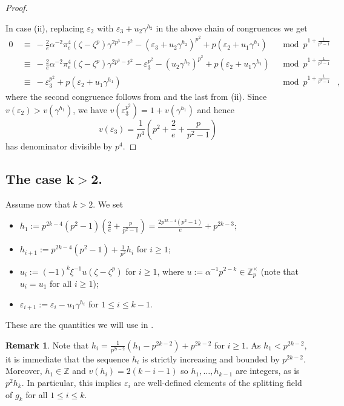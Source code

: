 \documentclass{amsart}
\theoremstyle{definition}
\newtheorem{remark}[theorem]{Remark}
\newcommand{\Z}{\mathbb{Z}}
\numberwithin{theorem}{section}
\numberwithin{equation}{section}
\begin{document}
\begin{proof}
\begin{enumerate}
    \end{enumerate}
    In case (ii), replacing $\varepsilon_2$ with $\varepsilon_3 + u_2\gamma^{h_2}$ in the above chain of congruences we get
    \begin{align*}
        0 \ 
        &\equiv \ -\tfrac{2}{e}\alpha^{-2}\pi_e^4(\zeta-\zeta^p)\gamma^{2p^3-p^2} - (\varepsilon_3+u_2\gamma^{h_2})^{p^2} +p(\varepsilon_2 +u_1\gamma^{h_1}) & \mod p^{1+\frac{1}{p^2-1}} \\
        &\equiv \ -\tfrac{2}{e}\alpha^{-2}\pi_e^4(\zeta-\zeta^p)\gamma^{2p^3-p^2} - \varepsilon_3^{p^2} -(u_2\gamma^{h_2})^{p^2} +p(\varepsilon_2 +u_1\gamma^{h_1}) & \mod p^{1+\frac{1}{p^2-1}} \\
        &\equiv \ -\varepsilon_3^{p^2} +p(\varepsilon_2 +u_1\gamma^{h_1}) & \mod p^{1+\frac{1}{p^2-1}}&,
    \end{align*}
    where the second congruence follows from  and the last from (ii).
    Since $v(\varepsilon_2)>v(\gamma^{h_1})$, we have $v(\varepsilon_3^{p^2})=1+v(\gamma^{h_1})$ and hence
    \[
    v(\varepsilon_3)=\frac{1}{p^4} \left(p^2+\frac{2}{e}+\frac{p}{p^2-1} \right)
    \]
    has denominator divisible by $p^4$.
\end{proof}


\subsection{The case $\mathbf{k>2}$.}

Assume now that $k>2$. We set 
\begin{itemize}
    \item $h_1 := p^{2k-4}(p^2-1)\left(\frac{2}{e} + \frac{p}{p^2-1}\right) = \frac{2p^{2k-4}(p^2-1)}{e} + p^{2k-3}$;
    \item $h_{i+1} := p^{2k-4}(p^2-1) + \frac{1}{p^2}h_i$ for $i \ge 1$;
    \item $u_i := (-1)^{k} \xi^{-1} u (\zeta - \zeta^p)$ for $i \geq 1$, where $u := \alpha^{-1}p^{2-k} \in \mathbb{Z}_p^\times$ (note that $u_i = u_1$ for all $i \ge 1$);
    \item $\varepsilon_{i+1} := \varepsilon_i - u_1\gamma^{h_i}$ for $1 \le i \le k-1$.
\end{itemize}
These are the quantities we will use in  .

\begin{remark}\label{rmk: h_i inequalities}
    Note that $h_i=\frac{1}{p^{2i-2}}(h_1-p^{2k-2}) + p^{2k-2}$ for $i \geq 1$. As $h_1 < p^{2k-2}$, it is immediate that the sequence $h_i$ is strictly increasing and bounded by $p^{2k-2}$. Moreover, $h_1 \in \Z$ and $v(h_i)=2(k-i-1)$ so $h_1,\ldots,h_{k-1}$ are integers, as is $p^2h_k$. In particular, this implies $\varepsilon_i$ are well-defined elements of the splitting field of $g_k$ for all $1 \leq i \leq k$.
\end{remark}
\end{document}
